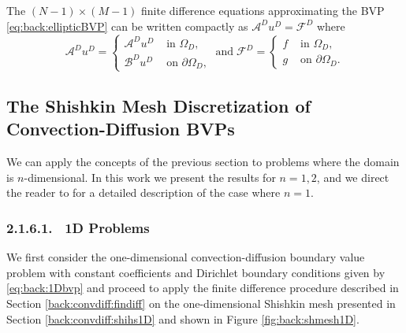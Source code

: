 %
The $(N-1)\times(M-1)$ finite difference equations approximating the BVP
\eqref{eq:back:ellipticBVP} can be written compactly as
$\mathcal{A}^Du^D=\mathcal{F}^D$ where
\begin{equation}
\mathcal{A}^{D}u^D =
\begin{cases}
\mathscr{A}^{D}u^{D} & \text{ in } \Omega_D,\\
\mathscr{B}^{D}u^{D} & \text{ on } \partial\Omega_D,
\end{cases}
\;\text{
 and
}\;
\mathcal{F}^D=
\begin{cases}
f   & \text{ in } \Omega_D,\\
g   & \text{ on } \partial\Omega_D.
\end{cases}
\label{eq:back:2DconvdiffD}
\end{equation}

%
\subsection{The Shishkin Mesh Discretization of Convection-Diffusion BVPs}
\label{back:ModProb}

We can apply the concepts of the previous section to problems where the domain
is $n$-dimensional. In this work we present the results for $n=1,2$, and we
direct the reader to \cite[\S~6.2]{GriDolSil15} for a detailed description
of the case where $n=1$.

\subsubsection{2.1.6.1. \ 1D Problems}
We first consider the one-dimensional convection-diffusion boundary value
problem with constant coefficients and Dirichlet boundary conditions given by
\eqref{eq:back:1Dbvp} and proceed to apply the finite difference procedure
described in Section \ref{back:convdiff:findiff} on the one-dimensional
Shishkin mesh presented in Section \ref{back:convdiff:shihs1D} and shown in
Figure \ref{fig:back:shmesh1D}.

